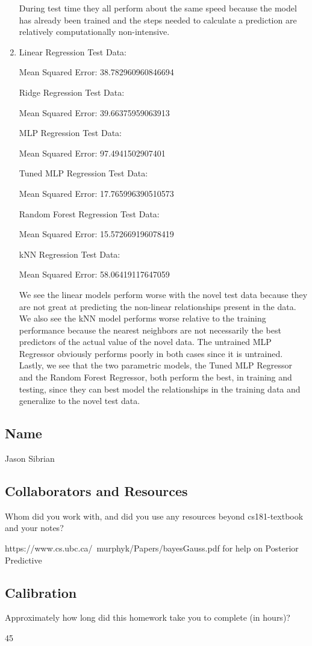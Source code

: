 \documentclass[submit]{harvardml}
\begin{document}
\begin{enumerate}
    During test time they all perform about the same speed because the model has already been trained and the steps needed to calculate a prediction are relatively computationally non-intensive.
    
    \item
    Linear Regression Test Data:
    
    Mean Squared Error: 38.782960960846694
    
    Ridge Regression Test Data:
    
    Mean Squared Error: 39.66375959063913
    
    MLP Regression Test Data:
    
    Mean Squared Error: 97.4941502907401
    
    Tuned MLP Regression Test Data:
    
    Mean Squared Error: 17.765996390510573
    
    Random Forest Regression Test Data:
    
    Mean Squared Error: 15.572669196078419
    
    kNN Regression Test Data:
    
    Mean Squared Error: 58.06419117647059

    We see the linear models perform worse with the novel test data because they are not great at predicting the non-linear relationships present in the data. We also see the kNN model performs worse relative to the training performance because the nearest neighbors are not necessarily the best predictors of the actual value of the novel data. The untrained MLP Regressor obviously performs poorly in both cases since it is untrained. Lastly, we see that the two parametric models, the Tuned MLP Regressor and the Random Forest Regressor, both perform the best, in training and testing, since they can best model the relationships in the training data and generalize to the novel test data.
 \end{enumerate}
\newpage
\subsection*{Name}

Jason Sibrian

\subsection*{Collaborators and Resources}
Whom did you work with, and did you use any resources beyond cs181-textbook and your notes?

https://www.cs.ubc.ca/~murphyk/Papers/bayesGauss.pdf for help on Posterior Predictive

\subsection*{Calibration}
Approximately how long did this homework take you to complete (in hours)? 

45
\end{document}
